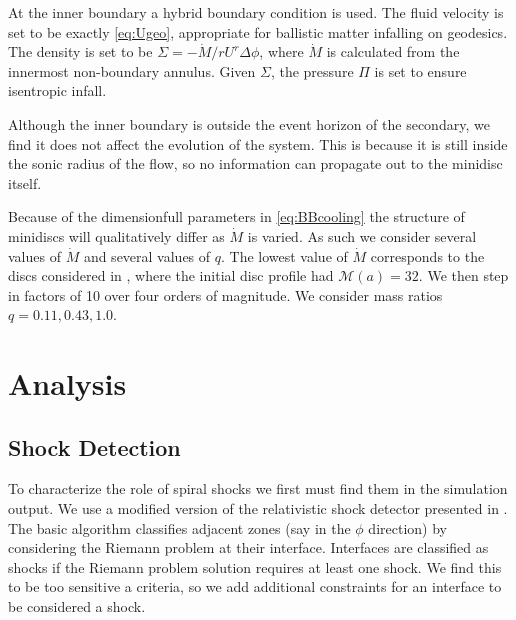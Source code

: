 \documentclass{emulateapj}
\newcommand{\De}{\Delta}
\newcommand{\Sig}{\Sigma}
\begin{document}
At the inner boundary a hybrid boundary condition is used.  The fluid velocity is set to be exactly \eqref{eq:Ugeo}, appropriate for ballistic matter infalling on geodesics.  The density is set to be $\Sig = -\dot{M} / r U^r \De \phi$, where $\dot{M}$ is calculated from the innermost non-boundary annulus.  Given $\Sig$, the pressure $\Pi$ is set to ensure isentropic infall.

Although the inner boundary is outside the event horizon of the secondary, we find it does not affect the evolution of the system.  This is because it is still inside the sonic radius of the flow, so no information can propagate out to the minidisc itself.  

Because of the dimensionfull parameters in \eqref{eq:BBcooling} the structure of minidiscs will qualitatively differ as $\dot{M}$ is varied.  As such we consider several values of $\dot{M}$ and several values of $q$.  The lowest value of $\dot{M}$ corresponds to the discs considered in \cite{Farris14}, where the initial disc profile had $\mathcal{M}(a) = 32$.  We then step in factors of 10 over four orders of magnitude.  We consider mass ratios $q = 0.11, 0.43, 1.0$.



\section{Analysis}
\label{sec:analysis}


\subsection{Shock Detection}
\label{subsec:shockDet}

To characterize the role of spiral shocks we first must find them in the simulation output.  We use a modified version of the relativistic shock detector presented in \citep{Zanotti10}.  The basic algorithm classifies adjacent zones (say in the $\phi$ direction) by considering the Riemann problem at their interface.  Interfaces are classified as shocks if the Riemann problem solution requires at least one shock.  We find this to be too sensitive a criteria, so we add additional constraints for an interface to be considered a shock.
\end{document}
